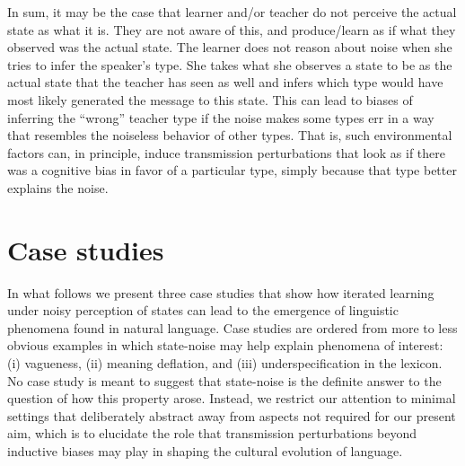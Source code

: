 \documentclass[10pt,a4paper]{article}
\newcommand{\citeposs}[2][]{\citeauthor{#2}'s (\citeyear[#1]{#2})}
\begin{document}
In sum, it may be the case that learner and/or teacher do not perceive the actual state as what
it is. They are not aware of this, and produce/learn as if what they observed was the actual
state. The learner does not reason about noise when she tries to infer the
speaker's type. She takes what she observes a state to be as the actual state that the teacher
has seen as well and infers which type would have most likely generated the message to this
state. This can lead to biases of inferring the ``wrong'' teacher type if the noise makes some
types err in a way that resembles the noiseless behavior of other types. That is, such
environmental factors can, in principle, induce transmission perturbations that look as if there was a
cognitive bias in favor of a particular type, simply because that type better explains the
noise.


\section{Case studies}

In what follows we present three case studies that show how iterated learning under noisy
perception of states can lead to the emergence of linguistic phenomena found in natural
language. Case studies are ordered from more to less obvious examples in which state-noise may
help explain phenomena of interest: (i) vagueness, (ii) meaning deflation, and (iii)
underspecification in the lexicon.
No case study is meant to suggest that state-noise is the definite answer to the question of
how this property arose. Instead, we restrict our attention to minimal settings that
deliberately abstract away from aspects not required for our present aim, which is to elucidate
the role that transmission perturbations beyond inductive biases may play in shaping the
cultural evolution of language.
\end{document}
